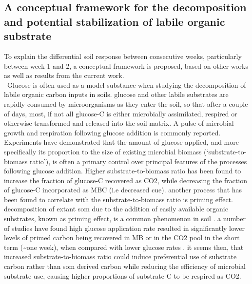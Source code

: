 \documentclass[12pt]{report}
\begin{document}
		\subsection{A conceptual framework for the decomposition and potential stabilization of labile organic substrate}
		To explain the differential soil response between consecutive weeks, particularly between week 1 and 2, a conceptual framework is proposed, based on other works as well as results from the current work.\\ \
		Glucose is often used as a model substance when studying the decomposition of labile organic carbon inputs in soils\citep{kuzyakov2010}. glucose and other labile substrates are rapidly consumed by microorganisms as they enter the soil, so that after a couple of days, most, if not all glucose-C is either microbially assimilated, respired or otherwise transformed and released into the soil matrix\citep{fischer2010}. A pulse of microbial growth and respiration following glucose addition is commonly reported.
		Experiments have demonstrated that the amount of glucose applied, and more specifically its proportion to the size of existing microbial biomass (‘substrate-to-biomass ratio’), is often a primary control over principal features of the processes following  glucose addition. Higher substrate-to-biomass ratio has been found to increase the fraction of glucose-C recovered as CO2, while decreasing the fraction of glucose-C incorporated as MBC (i.e decreased \gls{cue})\citep{schneckenberger2008, tian2015}.
		another process that has been found to correlate with the substrate-to-biomass ratio is priming effect. decomposition of extant \gls{som} due to the addition of easily available organic substrates, known as priming effect, is a common phenomenon in soil \citep{kuzyakov2010}. a number of studies have found  high glucose application rate resulted in significantly lower levels of primed carbon being recovered in MB or in the  CO2 pool in the short term (\~{}one week), when compared with lower glucose rates \citep{blagodatskaya2011, schneckenberger2008, wu1993}.
		it seems then, that increased substrate-to-biomass ratio could induce preferential use of substrate carbon rather than \gls{som} derived carbon while reducing the efficiency of microbial substrate use, causing higher proportions of substrate C to be respired as CO2.
\end{document}
